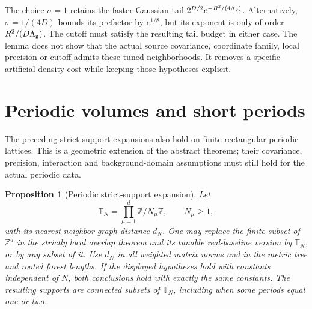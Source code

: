 \documentclass[11pt]{article}
\newtheorem{proposition}[theorem]{Proposition}
\theoremstyle{remark}
\begin{document}
The choice $\sigma=1$ retains the faster Gaussian tail
$2^{D/2}e^{-R^2/(4\Lambda_{\rm g})}$. Alternatively,
$\sigma=1/(4D)$ bounds its prefactor by $e^{1/8}$,
but its exponent is only of order $R^2/(D\Lambda_{\rm g})$.
The cutoff must satisfy the resulting tail budget in either
case. The lemma does not show that the actual source
covariance, coordinate family, local precision or cutoff
admits these tuned neighborhoods. It removes a specific
artificial density cost while keeping those hypotheses
explicit.


\section{Periodic volumes and short periods}
\label{op-section}

The preceding strict-support expansions also hold on finite rectangular
periodic lattices. This is a geometric extension of the abstract theorems;
their covariance, precision, interaction and background-domain assumptions
must still hold for the actual periodic data.

\begin{proposition}[Periodic strict-support expansion]
\label{op-periodic-theorem}
Let
\[
 \mathbb T_N=\prod_{\mu=1}^{d}\mathbb Z/N_\mu\mathbb Z,
 \qquad N_\mu\ge1,
\]
with its nearest-neighbor graph distance $d_N$. One may replace the finite
subset of $\mathbb Z^d$ in the strictly local overlap theorem and its
tunable real-baseline version by $\mathbb T_N$, or by any subset of it.
Use $d_N$ in all weighted matrix norms and in the metric tree and rooted
forest lengths. If the displayed hypotheses hold with constants independent
of $N$, both conclusions hold with exactly the same constants. The resulting
supports are connected subsets of $\mathbb T_N$, including when some
periods equal one or two.
\end{proposition}
\end{document}
